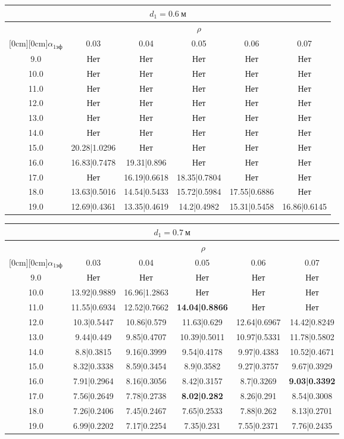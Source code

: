 \documentclass[20pt]{article}
\begin{document}
\begin{center}
\begin{tabular}{c|ccccc}
\hline
	\multicolumn{6}{c}{$d_{1}=0.6 \ м$} \\
\hline
	 & \multicolumn{5}{|c}{$\rho$} \\
	\cline{2-6}
	\raisebox{1.5ex}[0cm][0cm]{$\alpha_{1эф}$} & 0.03 & 0.04 & 0.05 & 0.06 & 0.07\\
\hline
	9.0 & 	Нет & 	Нет & 	Нет & 	Нет & 	Нет\\
	10.0 & 	Нет & 	Нет & 	Нет & 	Нет & 	Нет\\
	11.0 & 	Нет & 	Нет & 	Нет & 	Нет & 	Нет\\
	12.0 & 	Нет & 	Нет & 	Нет & 	Нет & 	Нет\\
	13.0 & 	Нет & 	Нет & 	Нет & 	Нет & 	Нет\\
	14.0 & 	Нет & 	Нет & 	Нет & 	Нет & 	Нет\\
	15.0 & 	20.28|1.0296 & 	Нет & 	Нет & 	Нет & 	Нет\\
	16.0 & 	16.83|0.7478 & 	19.31|0.896 & 	Нет & 	Нет & 	Нет\\
	17.0 & 	Нет & 	16.19|0.6618 & 	18.35|0.7804 & 	Нет & 	Нет\\
	18.0 & 	13.63|0.5016 & 	14.54|0.5433 & 	15.72|0.5984 & 	17.55|0.6886 & 	Нет\\
	19.0 & 	12.69|0.4361 & 	13.35|0.4619 & 	14.2|0.4982 & 	15.31|0.5458 & 	16.86|0.6145\\
\end{tabular}

\begin{tabular}{c|ccccc}
\hline
	\multicolumn{6}{c}{$d_{1}=0.7 \ м$} \\
\hline
	 & \multicolumn{5}{|c}{$\rho$} \\
	\cline{2-6}
	\raisebox{1.5ex}[0cm][0cm]{$\alpha_{1эф}$} & 0.03 & 0.04 & 0.05 & 0.06 & 0.07\\
\hline
	9.0 & 	Нет & 	Нет & 	Нет & 	Нет & 	Нет\\
	10.0 & 	13.92|0.9889 & 	16.96|1.2863 & 	Нет & 	Нет & 	Нет\\
	11.0 & 	11.55|0.6934 & 	12.52|0.7662 & 	\textbf{14.04|0.8866} & 	Нет & 	Нет\\
	12.0 & 	10.3|0.5447 & 	10.86|0.579 & 	11.63|0.629 & 	12.64|0.6967 & 	14.42|0.8249\\
	13.0 & 	9.44|0.449 & 	9.85|0.4707 & 	10.39|0.5011 & 	10.97|0.5331 & 	11.78|0.5802\\
	14.0 & 	8.8|0.3815 & 	9.16|0.3999 & 	9.54|0.4178 & 	9.97|0.4383 & 	10.52|0.4671\\
	15.0 & 	8.32|0.3338 & 	8.59|0.3454 & 	8.9|0.3582 & 	9.27|0.3757 & 	9.67|0.3929\\
	16.0 & 	7.91|0.2964 & 	8.16|0.3056 & 	8.42|0.3157 & 	8.7|0.3269 & 	\textbf{9.03|0.3392}\\
	17.0 & 	7.56|0.2649 & 	7.78|0.2738 & 	\textbf{8.02|0.282} & 	8.26|0.291 & 	8.54|0.3008\\
	18.0 & 	7.26|0.2406 & 	7.45|0.2467 & 	7.65|0.2533 & 	7.88|0.262 & 	8.13|0.2701\\
	19.0 & 	6.99|0.2202 & 	7.17|0.2254 & 	7.35|0.231 & 	7.55|0.2371 & 	7.76|0.2435\\
\end{tabular}


\end{center}
\end{document}
